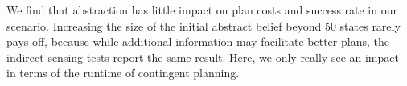 We find that abstraction has little impact on plan
costs and success rate in our scenario. Increasing the size of the
initial abstract belief beyond 50 states rarely pays off, because
while additional information may facilitate better plans, the indirect
sensing tests report the same result. Here, we only really see an
impact in terms of the runtime of contingent planning. 


